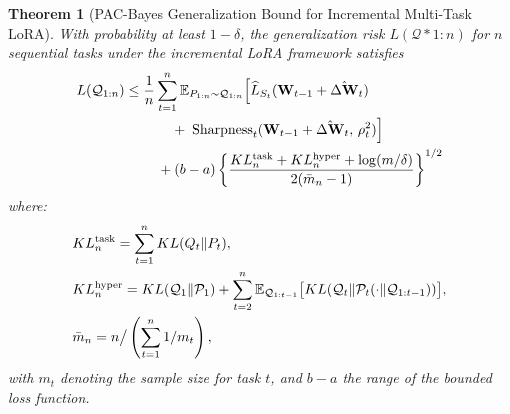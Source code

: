 \documentclass[letterpaper]{article} %
\newtheorem{theorem}{Theorem}
\begin{document}
\begin{theorem}[PAC-Bayes Generalization Bound for Incremental Multi-Task LoRA]
With probability at least $1-\delta$, the generalization risk $L(\mathcal{Q}*{1:n})$ for $n$ sequential tasks under the incremental LoRA framework satisfies
\begin{align}
L(\mathcal{Q}_{1:n}) \leq\; & \frac{1}{n} \sum_{t=1}^n 
    \mathbb{E}_{P_{1:n} \sim \mathcal{Q}_{1:n}}
    \Big[
        \widehat{L}_{S_t}(\mathbf{W}_{t-1} + \hat{\Delta\mathbf{W}}_t)
    \notag \\
&\qquad +\; \mathrm{Sharpness}_t(\mathbf{W}_{t-1} + \hat{\Delta\mathbf{W}}_t,\, \rho_t^2)
    \Big] 
    \notag \\
&\quad + (b-a) \left\{ 
    \frac{KL_n^{\text{task}} + KL_n^{\text{hyper}} + \log(m/\delta)}
         {2(\bar{m}_n - 1)}
\right\}^{1/2}
\label{eq:lora-pac-bayes-bound}
\end{align}
where:
\begin{align}
&KL_n^{\mathrm{task}} = \sum_{t=1}^n KL(Q_t\|P_t), \notag  \\
&KL_n^{\mathrm{hyper}} = KL(\mathcal{Q}_1 \| \mathcal{P}_1) + \sum_{t=2}^n \mathbb{E}_{\mathcal{Q}_{1:t-1}}\big[KL(\mathcal{Q}_t \| \mathcal{P}_t(\cdot \| \mathcal{Q}_{1:t-1}))\big], \notag\\
&\bar{m}_n = n \big/ \left(\sum_{t=1}^n 1/m_t\right), \notag
\end{align}
with $m_t$ denoting the sample size for task $t$, and $b-a$ the range of the bounded loss function.
\end{theorem}
\end{document}
